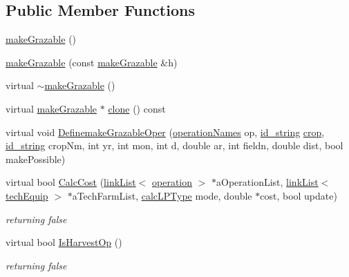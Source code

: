 \subsection*{Public Member Functions}
\begin{DoxyCompactItemize}
\item 
\hyperlink{classmake_grazable_ad90284cb8309bbbd8d2fb8c1337380fa}{makeGrazable} ()
\item 
\hyperlink{classmake_grazable_a0bb2b0d5484d9f7a0b606f12f514cb81}{makeGrazable} (const \hyperlink{classmake_grazable}{makeGrazable} \&h)
\item 
virtual \hyperlink{classmake_grazable_a415545fca903e5017402c2f40d482e14}{$\sim$makeGrazable} ()
\item 
virtual \hyperlink{classmake_grazable}{makeGrazable} $\ast$ \hyperlink{classmake_grazable_a52ff627730636a7a71b975a203edbf5f}{clone} () const 
\item 
virtual void \hyperlink{classmake_grazable_a0f9a354af4fef5ecc865d5bdbf76ec31}{DefinemakeGrazableOper} (\hyperlink{operation_names_8h_a77d40de6faa131199a5de6df3d9c7e3d}{operationNames} op, \hyperlink{classfield_operation_fields_a65517d20c09329343461131d07d48ecb}{id\_\-string} \hyperlink{classcrop}{crop}, \hyperlink{classfield_operation_fields_a65517d20c09329343461131d07d48ecb}{id\_\-string} cropNm, int yr, int mon, int d, double ar, int fieldn, double dist, bool makePossible)
\item 
virtual bool \hyperlink{classmake_grazable_ae09405366070332941b95c92b334c6c1}{CalcCost} (\hyperlink{classlink_list}{linkList}$<$ \hyperlink{classoperation}{operation} $>$ $\ast$aOperationList, \hyperlink{classlink_list}{linkList}$<$ \hyperlink{classtech_equip}{techEquip} $>$ $\ast$aTechFarmList, \hyperlink{typer_8h_af05cf854fc14086a0d6404be5ae9813f}{calcLPType} mode, double $\ast$cost, bool update)
\begin{DoxyCompactList}\small\item\em returning false \item\end{DoxyCompactList}\item 
virtual bool \hyperlink{classmake_grazable_a0c637b243ff0bc8232d121553f417573}{IsHarvestOp} ()
\begin{DoxyCompactList}\small\item\em returning false \item\end{DoxyCompactList}\end{DoxyCompactItemize}


